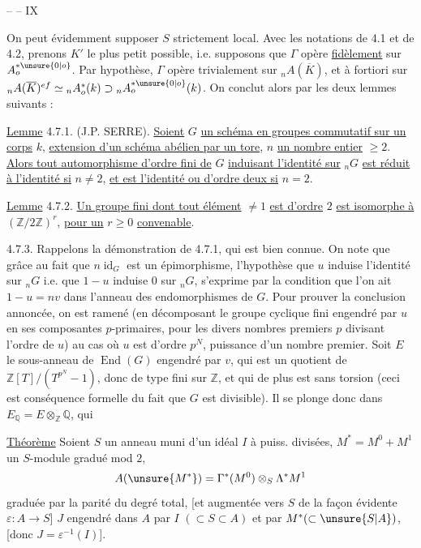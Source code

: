 \hfill --  -- \hfill IX

On peut évidemment supposer $S$ strictement local. Avec les notations de 4.1 et de 4.2, prenons $K'$ le plus petit possible, i.e. supposons que $\Gamma$ opère \uline{fidèlement} sur $A_o^{*\unsure{0|o}}$. Par hypothèse, $\Gamma$ opère trivialement sur ${}_nA(\overline K)$, et à fortiori sur ${}_nA(\overline K)^{ef}\simeq{}_nA_o^*(k)\supset{}_nA_o^{*\unsure{0|o}}(k)$. On conclut alors par les deux lemmes suivants :

\uline{Lemme} 4.7.1. (J.P. SERRE). \uline{Soient} $G$ \uline{un schéma en groupes commutatif sur un corps} $k$, \uline{extension d'un schéma abélien par un tore}, $n$ \uline{un nombre entier} $\geq2$. \uline{Alors tout automorphisme d'ordre fini de} $G$ \uline{induisant l'identité sur} ${}_nG$ \uline{est réduit à l'identité si} $n\neq2$, \uline{et est l'identité ou d'ordre deux si} $n=2$.

\uline{Lemme} 4.7.2. \uline{Un groupe fini dont tout élément} $\neq1$ \uline{est d'ordre} $2$ \uline{est isomorphe à} $(\mathbb Z/2\mathbb Z)^r$, \uline{pour un} $r\geq0$ \uline{convenable}.

4.7.3. Rappelons la démonstration de 4.7.1, qui est bien connue. On note que grâce au fait que $n\operatorname{id}_G$ est un épimorphisme, l'hypothèse que $u$ induise l'identité sur ${}_nG$ i.e. que $1-u$ induise $0$ sur ${}_nG$, s'exprime par la condition que l'on ait $1-u=nv$ dans l'anneau des endomorphismes de $G$. Pour prouver la conclusion annoncée, on est ramené (en décomposant le groupe cyclique fini engendré par $u$ en ses composantes $p$-primaires, pour les divers nombres premiers $p$ divisant l'ordre de $u$) au cas où $u$ est d'ordre $p^N$, puissance d'un nombre premier. Soit $E$ le sous-anneau de $\operatorname{End}(G)$ engendré par $v$, qui est un quotient de $\mathbb Z[T]/(T^{p^N}-1)$, donc de type fini sur $\mathbb Z$, et qui de plus est sans torsion (ceci est conséquence formelle du fait que $G$ est divisible). Il se plonge donc dans $E_{\mathbb Q}=E\otimes_{\mathbb Z}\mathbb Q$, qui

\uline{Théorème} Soient $S$ un anneau muni d'un idéal $I$ à puiss. divisées, $M^*=M^0+M^1$ un $S$-module gradué mod $2$,
\[
A(\unsure{M^*})=\Gamma^*(M^0)\otimes_S\Lambda^*M^1
\]
 graduée par la parité du degré total, [et augmentée vers $S$ de la façon évidente $\varepsilon:A\longrightarrow S$] $J$  engendré dans $A$ par $I$ $(\subset S\subset A)$ et par $M^*(\subset\unsure{S|A})$, [donc $J=\varepsilon^{-1}(I)$].

